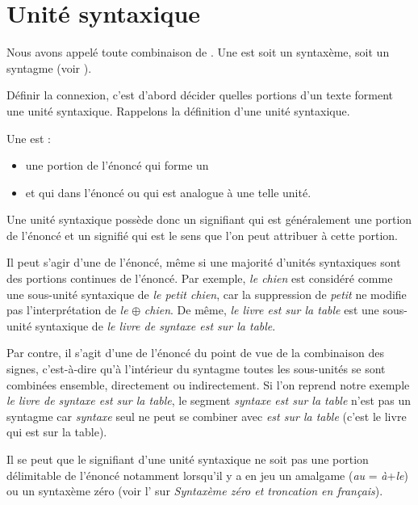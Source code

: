 \section{Unité syntaxique}\label{sec:3.2.9}

Nous avons appelé  toute combinaison de . Une  est soit un syntaxème, soit un syntagme (voir ).

Définir la connexion, c’est d’abord décider quelles portions d’un texte forment une unité syntaxique. Rappelons la définition d’une unité syntaxique.

{Une  est :

   \begin{itemize}
   \item une portion de l’énoncé qui forme un 
   \item et qui  dans l’énoncé ou qui est analogue à une telle unité.
   \end{itemize}
   }
   
Une unité syntaxique possède donc un signifiant qui est généralement une portion de l’énoncé et un signifié qui est le sens que l’on peut attribuer à cette portion.

Il peut s’agir d’une  de l’énoncé, même si une majorité d’unités syntaxiques sont des portions continues de l’énoncé. Par exemple, \textit{le chien} est considéré comme une sous-unité syntaxique de \textit{le petit chien}, car la suppression de \textit{petit} ne modifie pas l’interprétation de \textit{le} ${\oplus}$ \textit{chien}. De même, \textit{le livre est sur la table} est une sous-unité syntaxique de \textit{le livre de syntaxe est sur la table}.

Par contre, il s’agit d’une  de l’énoncé du point de vue de la combinaison des signes, c’est-à-dire qu’à l’intérieur du syntagme toutes les sous-unités se sont combinées ensemble, directement ou indirectement. Si l’on reprend notre exemple \textit{le livre de syntaxe est sur la table}, le segment \textit{syntaxe est sur la table} n’est pas un syntagme car \textit{syntaxe} seul ne peut se combiner avec \textit{est sur la table} (c’est le livre qui est sur la table).

Il se peut que le signifiant d’une unité syntaxique ne soit pas une portion délimitable de l’énoncé notamment lorsqu’il y a en jeu un amalgame (\textit{au} = \textit{à}+\textit{le}) ou un syntaxème zéro (voir l’ sur \textit{Syntaxème zéro et troncation en français}).

